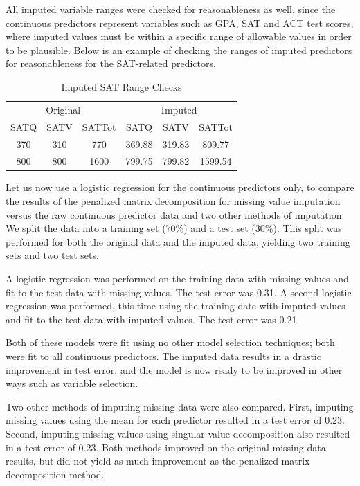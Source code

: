 \documentclass{article}
\begin{document}
All imputed variable ranges were checked for reasonableness as well, since the continuous predictors represent variables such as GPA, SAT and ACT test scores, where imputed values must be within a specific range of allowable values in order to be  plausible.  Below is an example of checking the ranges of imputed predictors for reasonableness for the SAT-related predictors.

\begin{table}[H]
  \caption{Imputed SAT Range Checks}
  \label{sample-table1}
  \centering
  \begin{tabular}{cccccc}
    \toprule
    \multicolumn{3}{c}{Original} &
    \multicolumn{3}{c}{Imputed}\\

    \cmidrule{1-6}
    SATQ  &SATV &SATTot  & SATQ  &SATV &SATTot\\
    \midrule
     370	& 310	& \phantom{0}770	& 369.88	& 319.83	& \phantom{0}809.77	\\
     800	& 800	& 1600  			& 799.75	& 799.82	& 1599.54			\\
    \bottomrule
  \end{tabular}
\end{table}

Let us now use a logistic regression for the continuous predictors only, to compare the results of the penalized matrix decomposition for missing value imputation versus the raw continuous predictor data and two other methods of imputation.  We split the data into a training set (70\%) and a test set (30\%).  This split was performed for both the original data and the imputed data, yielding two training sets and two test sets.

A logistic regression was performed on the training data with missing values and fit to the test data with missing values.  The test error was 0.31.  A second logistic regression was performed, this time using the training date with imputed values and fit to the test data with imputed values.  The test error was 0.21.

Both of these models were fit using no other model selection techniques; both were fit to all continuous predictors. The imputed data results in a drastic improvement in test error, and the model is now ready to be improved in other ways such as variable selection.

Two other methods of imputing missing data were also compared.  First, imputing missing values using the mean for each predictor resulted in a test error of 0.23.  Second, imputing missing values using singular value decomposition also resulted in a test error of 0.23.  Both methods improved on the original missing data results, but did not yield as much improvement as the penalized matrix decomposition method.
\end{document}
